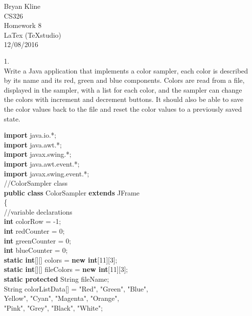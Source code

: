 \documentclass[12pt]{article}
\begin{document}
\begin{center}

\Huge
Bryan Kline\\
[10mm]
CS326\\ 
[10mm]
Homework 8\\
\small LaTex (TeXstudio)\\
[10mm]
\Huge
12/08/2016\\
[200mm]

\end{center}

\begin{flushleft}

1.\\
Write a Java application that implements a color sampler, each color is described by its name and its red, green and blue components.  Colors are read from a file, displayed in the sampler, with a list for each color, and the sampler can change the colors with increment and decrement buttons.  It should also be able to save the color values back to the file and reset the color values to a previously saved state.\\
[4mm]
{\selectfont

	
	\textbf{import} java.io.*;\\
	\textbf{import} java.awt.*;\\
	\textbf{import} javax.swing.*;\\
	\textbf{import} java.awt.event.*;\\
	\textbf{import} javax.swing.event.*;\\
	[2mm]
	
	//ColorSampler class\\
	\textbf{public class} ColorSampler \textbf{extends} JFrame\\ 
	\{\\
\qquad		//variable declarations\\  
\qquad		\textbf{int} colorRow = -1;\\
\qquad		\textbf{int} redCounter = 0;\\
\qquad		\textbf{int} greenCounter = 0;\\
\qquad		\textbf{int} blueCounter = 0;\\
\qquad		\textbf{static int}[][] colors = \textbf{new int}[11][3];\\
\qquad		\textbf{static int}[][] fileColors = \textbf{new int}[11][3];\\
\qquad		\textbf{static protected} String fileName;\\
\qquad		String colorListData[] = {"Red", "Green", "Blue",\\
\qquad \qquad \qquad \qquad \qquad \qquad  \qquad Yellow", "Cyan", "Magenta", "Orange",\\
\qquad \qquad \qquad \qquad \qquad \qquad \qquad \qquad \qquad "Pink", "Grey", "Black", "White"};\\ 
		[2mm]
		
}
\end{flushleft}
\end{document}
